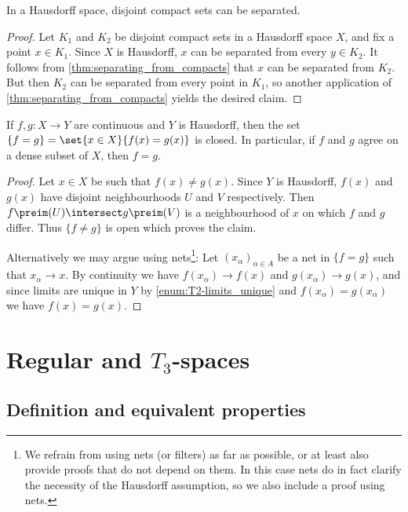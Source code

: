 \documentclass[article, a4paper, 11pt, oneside]{memoir}
\numberwithin{equation}{chapter}
\begin{document}
\begin{proposition}
    \label{thm:Hausdorff-separate-compacts}
    In a Hausdorff space, disjoint compact sets can be separated.
\end{proposition}

\begin{proof}
    Let $K_1$ and $K_2$ be disjoint compact sets in a Hausdorff space $X$, and fix a point $x \in K_1$. Since $X$ is Hausdorff, $x$ can be separated from every $y \in K_2$. It follows from \cref{thm:separating_from_compacts} that $x$ can be separated from $K_2$. But then $K_2$ can be separated from every point in $K_1$, so another application of \cref{thm:separating_from_compacts} yields the desired claim.
\end{proof}


\begin{proposition}
    If $f,g \colon X \to Y$ are continuous and $Y$ is Hausdorff, then the set $\{f = g\} = \set{x \in X}{f(x) = g(x)}$ is closed. In particular, if $f$ and $g$ agree on a dense subset of $X$, then $f = g$.
\end{proposition}

\begin{proof}
    Let $x \in X$ be such that $f(x) \neq g(x)$. Since $Y$ is Hausdorff, $f(x)$ and $g(x)$ have disjoint neighbourhoods $U$ and $V$ respectively. Then $f\preim(U) \intersect g\preim(V)$ is a neighbourhood of $x$ on which $f$ and $g$ differ. Thus $\{f \neq g\}$ is open which proves the claim.

    Alternatively we may argue using nets\footnote{We refrain from using nets (or filters) as far as possible, or at least also provide proofs that do not depend on them. In this case nets do in fact clarify the necessity of the Hausdorff assumption, so we also include a proof using nets.}: Let $(x_\alpha)_{\alpha \in A}$ be a net in $\{f = g\}$ such that $x_\alpha \to x$. By continuity we have $f(x_\alpha) \to f(x)$ and $g(x_\alpha) \to g(x)$, and since limits are unique in $Y$ by \cref{enum:T2-limits_unique} and $f(x_\alpha) = g(x_\alpha)$ we have $f(x) = g(x)$.
\end{proof}



\chapter[Regular and T3-spaces][Regular and $T_3$-spaces]{Regular and $T_3$-spaces}

\section{Definition and equivalent properties}
\end{document}
